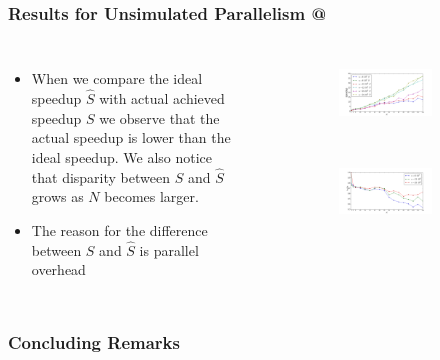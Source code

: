 \documentclass[9pt]{beamer}
\makeatletter
\newcommand*{\rom}[1]{\expandafter\@slowromancap\romannumeral #1@}
\makeatother
\begin{document}
\begin{frame}
\frametitle{Results for Unsimulated Parallelism \rom{2}}
\begin{columns}
\begin{itemize}
\item{When we compare the ideal speedup $\hat S$ with actual achieved speedup $S$ we observe that the actual speedup is lower than the ideal speedup. We also notice that disparity between $S$ and $\hat S$ grows as $N$ becomes larger.}
\item{The reason for the difference between $S$ and $\hat S$ is parallel overhead}
\end{itemize}
\begin{figure}
\centering
\begin{subfigure}{1\linewidth}
\centering
\includegraphics[scale=0.2]{SS.png}
\end{subfigure}
\\
\begin{subfigure}{1\linewidth}
\includegraphics[scale=0.2]{SS2.png}
\end{subfigure}
\end{figure}
\end{columns}
\end{frame}
\begin{frame}
\frametitle{Concluding Remarks}
\end{frame}
\end{document}
